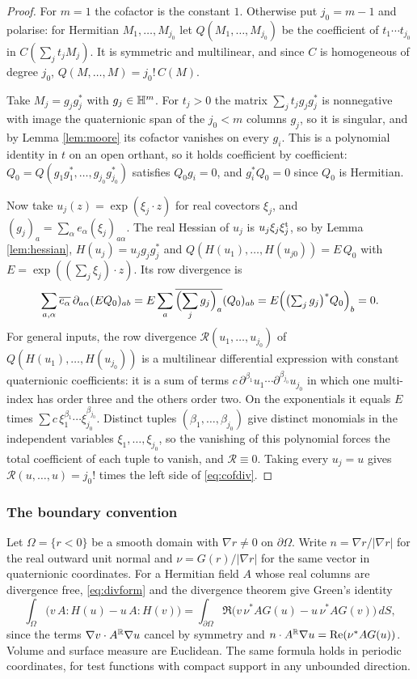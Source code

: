 \begin{proof}
For $m=1$ the cofactor is the constant $1$. Otherwise put $j_0=m-1$ and polarise: for Hermitian
$M_1,\dots,M_{j_0}$ let $Q(M_1,\dots,M_{j_0})$ be the coefficient of $t_1\cdots t_{j_0}$ in
$C(\sum_jt_jM_j)$. It is symmetric and multilinear, and since $C$ is homogeneous of degree
$j_0$, $Q(M,\dots,M)=j_0!\,C(M)$.

Take $M_j=g_jg_j^*$ with $g_j\in\mathbb{H}^m$. For $t_j>0$ the matrix $\sum_jt_jg_jg_j^*$ is nonnegative
with image the quaternionic span of the $j_0<m$ columns $g_j$, so it is singular, and by Lemma
\ref{lem:moore} its cofactor vanishes on every $g_i$. This is a polynomial identity in $t$ on an
open orthant, so it holds coefficient by coefficient: $Q_0=Q(g_1g_1^*,\dots,g_{j_0}g_{j_0}^*)$
satisfies $Q_0g_i=0$, and $g_i^*Q_0=0$ since $Q_0$ is Hermitian.

Now take $u_j(z)=\exp(\xi_j\cdot z)$ for real covectors $\xi_j$, and
$(g_j)_a=\sum_\alpha e_\alpha(\xi_j)_{a\alpha}$. The real Hessian of $u_j$ is $u_j\xi_j\xi_j^{\rm t}$, so
by Lemma \ref{lem:hessian}, $H(u_j)=u_jg_jg_j^*$ and
$Q(H(u_1),\dots,H(u_{j0}))=E\,Q_0$ with $E=\exp((\sum_j\xi_j)\cdot z)$. Its row divergence is
\[
\sum_{a,\alpha}\overline{e_\alpha}\,\partial_{a\alpha}(EQ_0)_{ab}
=E\sum_a\overline{\Bigl(\sum_jg_j\Bigr)_a}(Q_0)_{ab}=E\Bigl(\bigl(\textstyle\sum_jg_j\bigr)^*Q_0\Bigr)_b=0 .
\]
For general inputs, the row divergence $\mathcal R(u_1,\dots,u_{j_0})$ of
$Q(H(u_1),\dots,H(u_{j_0}))$ is a multilinear differential expression with constant quaternionic
coefficients: it is a sum of terms $c\,\partial^{\beta_1}u_1\cdots\partial^{\beta_{j_0}}u_{j_0}$
in which one multi-index has order three and the others order two. On the exponentials it
equals $E$ times $\sum c\,\xi_1^{\beta_1}\cdots\xi_{j_0}^{\beta_{j_0}}$. Distinct tuples
$(\beta_1,\dots,\beta_{j_0})$ give distinct monomials in the independent variables
$\xi_1,\dots,\xi_{j_0}$, so the vanishing of this polynomial forces the total coefficient of each
tuple to vanish, and $\mathcal R\equiv0$. Taking every $u_j=u$ gives
$\mathcal R(u,\dots,u)=j_0!$ times the left side of \eqref{eq:cofdiv}.
\end{proof}

\subsubsection*{The boundary convention}
Let $\Omega=\{r<0\}$ be a smooth domain with $\nabla r\ne0$ on $\partial\Omega$. Write
$n=\nabla r/|\nabla r|$ for the real outward unit normal and $\nu=G(r)/|\nabla r|$ for the same
vector in quaternionic coordinates. For a Hermitian field $A$ whose real columns are divergence
free, \eqref{eq:divform} and the divergence theorem give Green's identity
\begin{equation}\label{eq:green}
\int_\Omega\bigl(v\,A:H(u)-u\,A:H(v)\bigr)
=\int_{\partial\Omega}\Re\bigl(v\,\nu^*AG(u)-u\,\nu^*AG(v)\bigr)\,dS ,
\end{equation}
since the terms $\nabla v\cdot A^{\mathbb{R}}\nabla u$ cancel by symmetry and $n\cdot A^{\mathbb{R}}\nabla u=
\operatorname{Re}(\nu^*AG(u))$. Volume and surface measure are Euclidean. The same formula holds in periodic
coordinates, for test functions with compact support in any unbounded direction.

